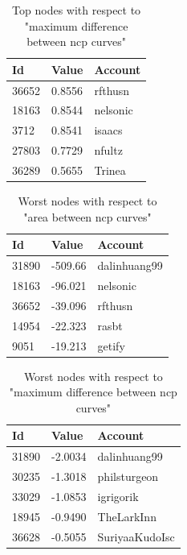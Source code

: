 \documentclass[9pt,twocolumn,twoside]{pnas-new}
\begin{document}
\begin{table}
    \centering
    \begin{tabular}{|l|l|l|}
        \hline
        Id & Value & Account \\ \hline
        36652 & 0.8556 & rfthusn \\ \hline
        18163 & 0.8544 & nelsonic \\ \hline
        3712 & 0.8541 & isaacs \\ \hline
        27803 & 0.7729 & nfultz \\ \hline
        36289 & 0.5655 & Trinea \\ \hline
    \end{tabular}
    \caption{Top nodes with respect to "maximum difference between ncp curves"}
    \label{tab:diff_top}
\end{table}

\begin{table}
    \centering
    \begin{tabular}{|l|l|l|}
        \hline
        Id & Value & Account \\ \hline
        31890 & -509.66 & dalinhuang99 \\ \hline
        18163 & -96.021 & nelsonic \\ \hline
        36652 & -39.096 & rfthusn \\ \hline
        14954 & -22.323 & rasbt \\ \hline
        9051 & -19.213 & getify \\ \hline
    \end{tabular}
    \caption{Worst nodes with respect to "area between ncp curves"}
    \label{tab:area_worst}
\end{table}

\begin{table}
    \centering
    \begin{tabular}{|l|l|l|}
        \hline
        Id & Value & Account \\ \hline
        31890 & -2.0034 & dalinhuang99 \\ \hline
        30235 & -1.3018 & philsturgeon \\ \hline
        33029 & -1.0853 & igrigorik \\ \hline
        18945 & -0.9490 & TheLarkInn \\ \hline
        36628 & -0.5055 & SuriyaaKudoIsc \\ \hline
    \end{tabular}
    \caption{Worst nodes with respect to "maximum difference between ncp curves"}
    \label{tab:diff_worst}
\end{table}


\end{document}
